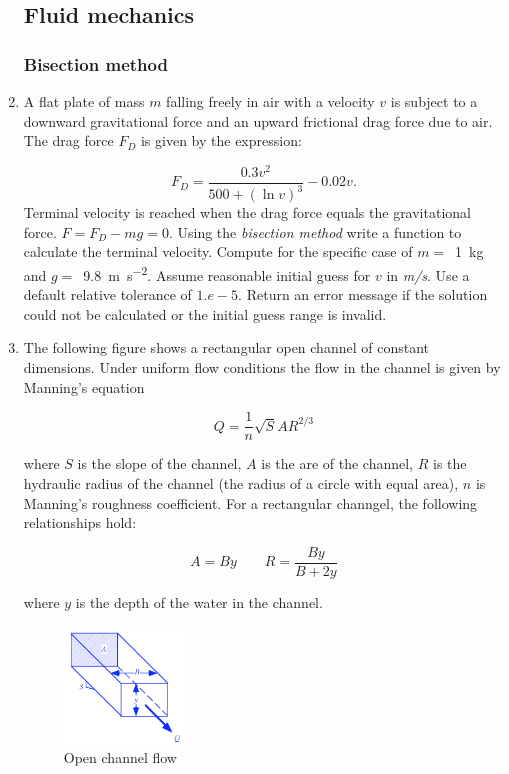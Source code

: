 \documentclass[a4paper,12pt]{article}
\begin{document}
\begin{enumerate}
	\subsection*{Fluid mechanics}
	\subsubsection*{Bisection method}
	\item A flat plate of mass $m$ falling freely in air with a velocity $v$ is subject to a downward gravitational force and an upward frictional drag force due to air. The drag force $F_D$ is given by the expression:
	
	\begin{equation*}
		F_D = \frac{0.3 v^2}{500 + (\ln v)^3} - 0.02 v.
	\end{equation*}
	Terminal velocity is reached when the drag force equals the gravitational force. $F = F_D - mg = 0$. Using the \textit{bisection method} write a function to calculate the terminal velocity. Compute for the specific case of $m = $~\SI{1}{\kilogram} and $g =$~\SI{9.8}{\meter\per\second\squared}. Assume reasonable initial guess for $v$ in \textit{m/s}. Use a default relative tolerance of $1.e-5$. Return an error message if the solution could not be calculated or the initial guess range is invalid. 
	
	\item The following figure shows a rectangular open channel of constant dimensions. Under uniform flow conditions the flow in the channel is given by Manning's equation
	
	\begin{equation}
	\label{eq:q}
	Q = \frac{1}{n}\sqrt{S} A R^{2/3}
	\end{equation}
	
	where $S$ is the slope of the channel, $A$ is the are of the channel, $R$ is the hydraulic radius of the channel (the radius of a circle with equal area), $n$ is Manning's roughness coefficient. For a rectangular channgel, the following relationships hold:
	
	\begin{equation}
	\label{eq:ar}
	A = By \qquad R = \frac{By}{B + 2 y}
	\end{equation}
	
	where $y$ is the depth of the water in the channel.
	
	\begin{figure}[!h]
		\centering
		\includegraphics[width=0.3\textwidth]{figs/open-channel.png}
		\caption{Open channel flow}
	\end{figure}


\end{enumerate}
\end{document}
